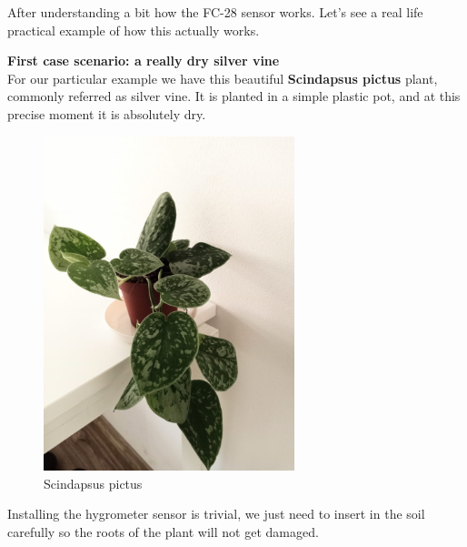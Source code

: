 After understanding a bit how the FC-28 sensor works. Let's see a real life practical example of how this actually works.

\vspace{5mm}
\textbf{First case scenario: a really dry silver vine} \\

For our particular example we have this beautiful \textbf{Scindapsus pictus} plant, commonly referred as silver vine. It is planted in a simple plastic pot, and at this precise moment it is absolutely dry.

\begin{figure}[H]
    \centering
    \includegraphics[width=0.65\textwidth]{fig/silvervine.jpeg}
    \caption{Scindapsus pictus}
    \label{fig:erica}
\end{figure}


Installing the hygrometer sensor is trivial, we just need to insert in the soil carefully so the roots of the plant will not get damaged.

